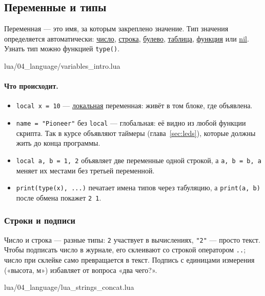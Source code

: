 \subsection{Переменные и типы}

Переменная --- это имя, за которым закреплено значение. Тип значения определяется автоматически: \hyperlink{term:number}{число}, \hyperlink{term:string}{строка}, \hyperlink{term:boolean}{булево}, \hyperlink{term:table}{таблица}, \hyperlink{term:function}{функция} или \hyperlink{term:nil}{nil}. Узнать тип можно функцией \verb|type()|.

\begin{codefile}{lua/04_language/variables_intro.lua}
\end{codefile}

\paragraph{Что происходит.}
\begin{itemize}
    \item \verb|local x = 10| --- \hyperlink{term:scope}{локальная} переменная: живёт в том блоке, где объявлена.
    \item \verb|name = "Pioneer"| без \verb|local| --- глобальная: её видно из любой функции скрипта. Так в курсе объявляют таймеры (глава~\ref{sec:leds}), которые должны жить до конца программы.
    \item \verb|local a, b = 1, 2| объявляет две переменные одной строкой, а \verb|a, b = b, a| меняет их местами без третьей переменной.
    \item \verb|print(type(x), ...)| печатает имена типов через табуляцию, а \verb|print(a, b)| после обмена покажет \texttt{2 1}.
\end{itemize}

\subsubsection*{Строки и подписи}

Число и строка --- разные типы: \verb|2| участвует в вычислениях, \verb|"2"| --- просто текст. Чтобы подписать число в журнале, его склеивают со строкой оператором \verb|..|; число при склейке само превращается в текст. Подпись с единицами измерения («высота, м») избавляет от вопроса «два чего?».

\begin{codefile}{lua/04_language/lua_strings_concat.lua}
\end{codefile}

